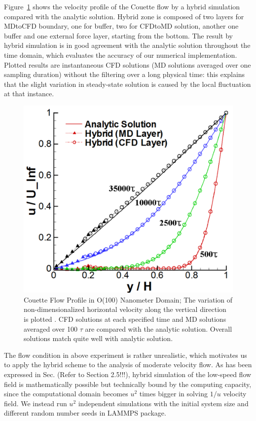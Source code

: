 \documentclass[preprint,12pt]{elsarticle}
\begin{document}
Figure~\ref{Flat_Plate_Sol_L} shows the velocity profile of the Couette flow by a hybrid simulation compared with the analytic solution. Hybrid zone is composed of two layers for MDtoCFD boundary, one for buffer, two for CFDtoMD solution, another one buffer and one external force layer, starting from the bottom. The result by hybrid simulation is in good agreement with the analytic solution throughout the time domain, which evaluates the accuracy of our numerical implementation. Plotted results are instantaneous CFD solutions (MD solutions averaged over one sampling duration) without the filtering over a long physical time: this explains that the slight variation in steady-state solution is caused by the local fluctuation at that instance.


\begin{figure}
\centering
\includegraphics[width=0.6\linewidth]{Couette_Large.pdf}
\vskip-0.2cm
\caption{\small Couette Flow Profile in O(100) Nanometer Domain; The variation of non-dimensionalized horizontal velocity along the vertical direction is plotted . CFD solutions at each specified time and MD solutions averaged over 100 $\tau$ are compared with the analytic solution. Overall solutions match quite well with analytic solution.}
\label{Flat_Plate_Sol_L}
\end{figure}


The flow condition in above experiment is rather unrealistic, which motivates us to apply the hybrid scheme to the analysis of moderate velocity flow. As has been expressed in Sec. (Refer to Section 2.5!!!), hybrid simulation of the low-speed flow field is mathematically possible but technically bound by the computing capacity, since the computational domain becomes $u^2$ times bigger in solving $1/u$ velocity field. We instead run $u^2$ independent simulations with the initial system size and different random number seeds in LAMMPS package. %
\end{document}
